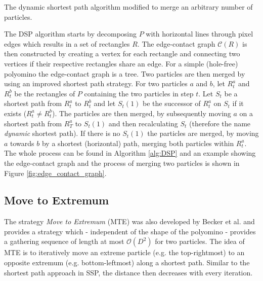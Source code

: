 \begin{algorithm}[ht]


    
    \caption[Dynamic Shortest Path Algorithm]{The dynamic shortest path algorithm modified to merge an arbitrary number of particles.}\label{alg:DSP}
\end{algorithm}

The DSP algorithm starts by decomposing $P$ with horizontal lines through pixel edges which results in a set of rectangles $R$. The edge-contact graph $\mathcal{C}(R)$ is then constructed by creating a vertex for each rectangle and connecting two vertices if their respective rectangles share an edge. For a simple (hole-free) polyomino the edge-contact graph is a tree. Two particles are then merged by using an improved shortest path strategy. For two particles $a$ and $b$, let $R^a_t$ and $R^b_t$ be the rectangles of $P$ containing the two particles in step $t$. Let $S_t$ be a shortest path from $R^a_t$ to $R^b_t$ and let $S_t(1)$ be the successor of $R^a_t$ on $S_t$ if it exists ($R^a_t \neq R^b_t$). The particles are then merged, by subsequently moving $a$ on a shortest path from $R^a_T$ to $S_t(1)$ and then recalculating $S_t$ (therefore the name \textit{dynamic} shortest path). If there is no $S_t(1)$ the particles are merged, by moving $a$ towards $b$ by a shortest (horizontal) path, merging both particles within $R^a_t$. The whole process can be found in Algorithm \ref{alg:DSP} and an example showing the edge-contact graph and the process of merging two particles is shown in Figure \ref{fig:edge_contact_graph}.


\subsection{Move to Extremum}
The strategy \textit{Move to Extremum} (MTE) was also developed by Becker et al. \cite{becker2020} and provides a strategy which - independent of the shape of the polyomino - provides a gathering sequence of length at most $\mathcal{O}(D^2)$ for two particles. The idea of MTE is to iteratively move an extreme particle (e.g. the top-rightmost) to an opposite extremum (e.g. bottom-leftmost) along a shortest path. Similar to the shortest path approach in SSP, the distance then decreases with every iteration. 

